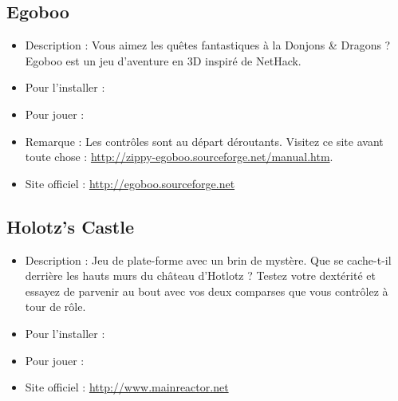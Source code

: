 \subsection{Egoboo}
\begin{itemize}
\begingroup
{}
\item Description : Vous aimez les quêtes fantastiques à la Donjons \& Dragons ? Egoboo est un jeu d'aventure en 3D inspiré de NetHack.{\par}
\endgroup
\item Pour l'installer : 
\item Pour jouer : 
\item Remarque : Les contrôles sont au départ déroutants. Visitez ce site avant toute chose : \url{http://zippy-egoboo.sourceforge.net/manual.htm}.{\par}
\item Site officiel : \url{http://egoboo.sourceforge.net}{\par}
\end{itemize}
\subsection{Holotz's Castle}
\begin{itemize}
\begingroup
{}
\item Description : Jeu de plate-forme avec un brin de mystère. Que se cache-t-il derrière les hauts murs du château d'Hotlotz ? Testez votre dextérité et essayez de parvenir au bout avec vos deux comparses que vous contrôlez à tour de rôle.{\par}
\item Pour l'installer : 
\item Pour jouer : 
\item Site officiel : \url{http://www.mainreactor.net}{\par}
\endgroup
\end{itemize}
